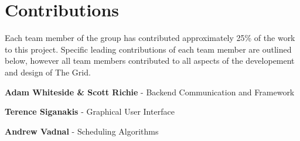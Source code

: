 \chapter{Contributions}
\label{contributions}

Each team member of the group has contributed approximately 25\% of the work to this project. Specific leading contributions of each team member are outlined below, however all team members contributed to all aspects of the developement and design of The Grid. 

\textbf{Adam Whiteside \& Scott Richie} - Backend Communication and Framework

\textbf{Terence Siganakis} - Graphical User Interface

\textbf{Andrew Vadnal} - Scheduling Algorithms

